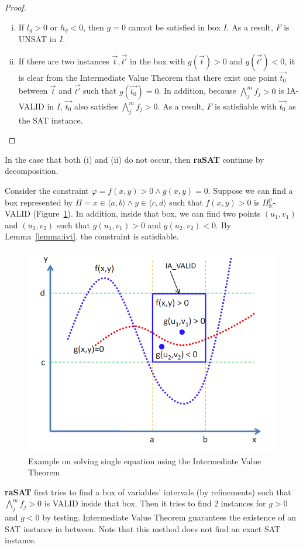 \documentclass[runningheads,a4paper,oribibl]{llncs}
\begin{document}
\begin{proof}
\begin{enumerate}[(i)]
\item If $l_g > 0$ or $h_g < 0$, then $g=0$ cannot be satisfied in box $I$. As a result, $F$ is UNSAT in $I$. 
\item If there are two instances $\vec{t},\vec{t'}$ in the box with $g(\vec{t}) > 0$ and $g(\vec{t'}) < 0$, it is clear from the Intermediate Value Theorem that there exist one point $\vec{t_0}$ between $\vec{t}$ and $\vec{t'}$ such that $g(\vec{t_0}) = 0$. In addition, because $\bigwedge \limits_{j}^m f_j > 0$ is IA-VALID in $I$, $\vec{t_0}$ also satisfies $\bigwedge \limits_{j}^m f_j > 0$. As a result, $F$ is satisfiable with $\vec{t_0}$ as the SAT instance.
\end{enumerate}
\end{proof}
In the case that both (i) and (ii) do not occur, then \textbf{raSAT} continue by decomposition.
\begin{example}
Consider the constraint $\varphi = f(x, y) > 0 \wedge g(x, y) = 0$. Suppose we can find a box represented by $\Pi = x \in \langle a, b \rangle \wedge y \in \langle c, d \rangle$ such that $f(x, y) > 0$ is $\Pi^p_\mathbb{R}$-VALID (Figure~\ref{fig:single-equation}). In addition, inside that box, we can find two points $(u_1, v_1)$ and $(u_2, v_2)$ such that $g(u_1, v_1) > 0$ and $g(u_2, v_2) < 0$. By Lemma~\ref{lemma:ivt}, the constraint is satisfiable.
\end{example}
\begin{figure}[ht]
\centering
\includegraphics[scale=0.5]{singleEquation.png} 
\caption{Example on solving single equation using the Intermediate Value Theorem} 
\label{fig:single-equation} 
\end{figure} 
{\bf raSAT} first tries to find a box of variables' intervals (by refinements) such that $\bigwedge \limits_{j}^m f_j > 0$ is VALID inside that box. Then it tries to find 2 instances for $g > 0$ and $g < 0$ by testing. 
Intermediate Value Theorem guarantees the existence of an SAT instance in between. 
Note that this method does not find an exact SAT instance. 
\end{document}
